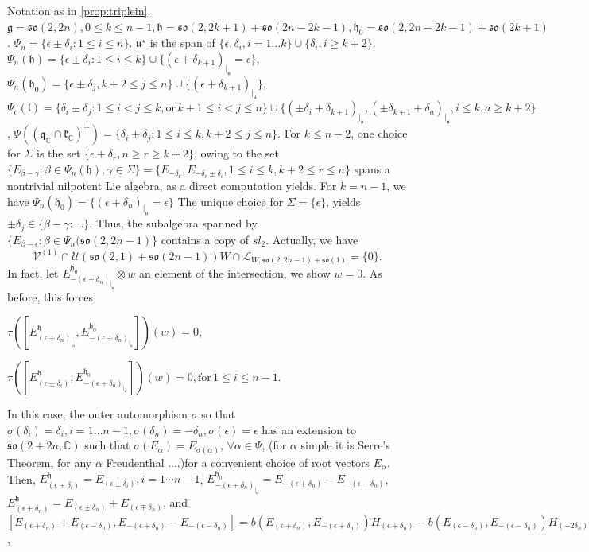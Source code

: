\documentclass[12pt]{amsart}
\theoremstyle{definition}
\theoremstyle{remark}
\newcommand{\g}{\mathfrak{g}}
\newcommand{\h}{\mathfrak{h}}
\renewcommand{\k}{{\mathfrak k}}
\renewcommand{\l}{\mathfrak l}
\newcommand{\q}{\mathfrak q}
\renewcommand{\u}{{\mathfrak u}}
\newcommand{\C}{{\mathbb C}}
\numberwithin{equation}{section}
\begin{document}
\smallskip
Notation as in \ref{prop:triplein}. $\g=\mathfrak{so}(2,2n), 0 \leq k\leq n-1, \h=\mathfrak{so}(2,2k+1)+\mathfrak{so}(2n-2k-1), \h_0=\mathfrak{so}(2,2n-2k-1)+\mathfrak{so}(2k+1)$.   $\Psi_n=\{\epsilon \pm \delta_i :  1 \leq i \leq n \}$. $\u^\star $ is the span of $\{ \epsilon , \delta_i, i=1\dots k \}\cup \{  \delta_i, i \geq  k+2 \}$.  $\Psi_n(\h)=\{ \epsilon \pm \delta_i  :  1 \leq i\leq k \}\cup \{(\epsilon + \delta_{k+1})_{\vert_\mathfrak u}=\epsilon \}$, $\Psi_n(\h_0)=\{ \epsilon \pm \delta_j, k+2 \leq j \leq n  \}\cup \{(\epsilon+ \delta_{k+1})_{\vert_\mathfrak u} \}$, $\Psi_c(\l)=\{\delta_i \pm \delta_j :  1 \leq i<j\leq k, \text{or}\, k+1 \leq i<j\leq n  \}\cup \{(\pm \delta_i + \delta_{k+1})_{\vert_\u}, (\pm \delta_{k+1} + \delta_{a})_{\vert_\u}, i\leq k, a\geq k+2\}$, $\Psi ((\q_\C \cap \k_\C)^+ )= \{\delta_i \pm \delta_j :  1 \leq i \leq k, k+2 \leq j \leq n \}$. For $k\leq n-2$, one  choice  for $\Sigma$ is the set
$  \{ \epsilon +\delta_r, n\geq r\geq k+2 \}$,  owing to the set  $\{E_{\beta -\gamma} : \beta \in \Psi_n(\h), \gamma \in \Sigma\}=\{ E_{-\delta_r}, E_{-\delta_r\pm \delta_i}, 1\leq i \leq k, k+2 \leq r \leq n \} $    spans a nontrivial  nilpotent Lie algebra, as a direct computation yields.
 For $k=n-1$, we have  $\Psi_n(\h_0)=\{(\epsilon+ \delta_{n})_{\vert_\mathfrak u}=\epsilon \}$
The unique choice for $\Sigma =\{\epsilon \}$, yields $\pm \delta_j \in \{ \beta -\gamma : ...\}$. Thus, the subalgebra spanned by  $\{E_{\beta -\epsilon} : \beta \in \Psi_n(\mathfrak{so}(2,2n-1) \}$ contains a copy of $sl_2$. Actually, we   have
\begin{equation}\label{eq:so2n21}\mathcal V^{(1)} \cap \mathcal U(\mathfrak{so}(2,1)+\mathfrak{so}( 2n-1))W \cap \mathcal L_{W, \mathfrak{so}(2,2n-1)+\mathfrak{so}(1)}  =\{0\}. \end{equation}
In fact, let $E_{-(\epsilon +\delta_n)_{\vert_\u}}^{\h_0} \otimes w$ an element of the intersection, we show $w=0$.  As before, this forces

 $\tau ([E_{(\epsilon +\delta_n)_{\vert_\u}}^{\h},E_{-(\epsilon +\delta_n)_{\vert_\u} }^{\h_0}])(w)=0$,

  $\tau ([E_{(\epsilon \pm \delta_i)}^\h ,E_{-(\epsilon +\delta_n)_{\vert_\u}}^{\h_0}])(w)=0, \text{for}\, 1\leq  i\leq n-1$.

  In this case, the outer automorphism $\sigma$  so that $\sigma(\delta_i)=\delta_i, i=1 \dots n-1, \sigma(\delta_n)=-\delta_n, \sigma(\epsilon)=\epsilon$ has an extension to $\mathfrak{so}(2+2n, \C)$ such that $\sigma(E_\alpha)=E_{\sigma(\alpha)}, \, \forall \alpha \in \Psi$, (for $\alpha$ simple it is Serre's Theorem, for any $\alpha$ Freudenthal ....)for a convenient choice of root vectors $E_\alpha$.  Then,
$E_{(\epsilon \pm \delta_i)}^\h=E_{(\epsilon \pm \delta_i)}, i=1\cdots n-1$, $E_{-(\epsilon +\delta_n)_{\vert_\u}}^{\h_0}=E_{-(\epsilon +\delta_n)}-E_{-(\epsilon -\delta_n)}$, $E_{(\epsilon \pm \delta_n)}^\h=E_{(\epsilon \pm \delta_n)}+ E_{(\epsilon \mp \delta_n)}$, and $[E_{(\epsilon + \delta_n)}+ E_{(\epsilon - \delta_n)}, E_{-(\epsilon +\delta_n)}-E_{-(\epsilon -\delta_n)}]= b(E_{(\epsilon + \delta_n)},  E_{-(\epsilon +\delta_n)})H_{(\epsilon + \delta_n)}-b(E_{(\epsilon - \delta_n)},E_{-(\epsilon - \delta_n)})H_{( -2\delta_n)}$,
\end{document}
